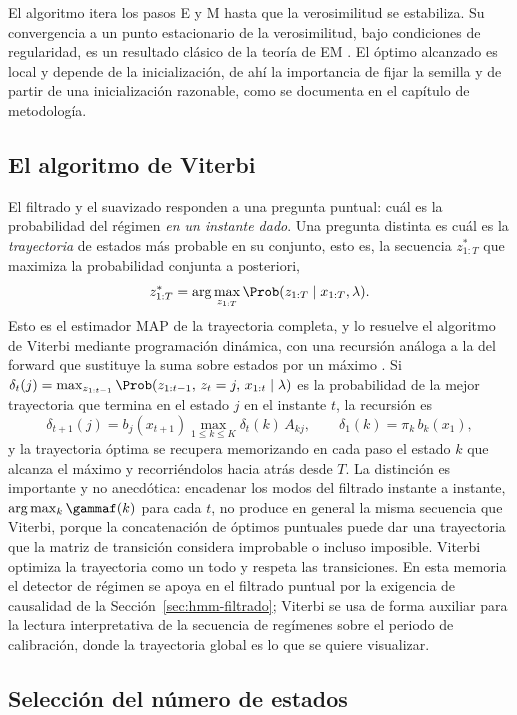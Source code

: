 El algoritmo itera los pasos E y M hasta que la verosimilitud se estabiliza. Su convergencia a un punto estacionario de la verosimilitud, bajo condiciones de regularidad, es un resultado clásico de la teoría de EM \cite{dempster1977}. El óptimo alcanzado es local y depende de la inicialización, de ahí la importancia de fijar la semilla y de partir de una inicialización razonable, como se documenta en el capítulo de metodología.

\subsection{El algoritmo de Viterbi}
\label{sec:hmm-viterbi}

El filtrado y el suavizado responden a una pregunta puntual: cuál es la probabilidad del régimen \emph{en un instante dado}. Una pregunta distinta es cuál es la \emph{trayectoria} de estados más probable en su conjunto, esto es, la secuencia $z_{1:T}^{\ast}$ que maximiza la probabilidad conjunta a posteriori,
\[
z_{1:T}^{\ast} = \arg\max_{z_{1:T}} \Prob(z_{1:T} \mid x_{1:T}, \lambda).
\]
Esto es el estimador MAP de la trayectoria completa, y lo resuelve el algoritmo de Viterbi mediante programación dinámica, con una recursión análoga a la del forward que sustituye la suma sobre estados por un máximo \cite{viterbi1967}. Si $\delta_t(j) = \max_{z_{1:t-1}} \Prob(z_{1:t-1},\, z_t = j,\, x_{1:t} \mid \lambda)$ es la probabilidad de la mejor trayectoria que termina en el estado $j$ en el instante $t$, la recursión es
\[
\delta_{t+1}(j) = b_j(x_{t+1}) \max_{1 \le k \le K} \delta_t(k)\, A_{kj},
\qquad \delta_1(k) = \pi_k\, b_k(x_1),
\]
y la trayectoria óptima se recupera memorizando en cada paso el estado $k$ que alcanza el máximo y recorriéndolos hacia atrás desde $T$. La distinción es importante y no anecdótica: encadenar los modos del filtrado instante a instante, $\arg\max_k \gammaf(k)$ para cada $t$, no produce en general la misma secuencia que Viterbi, porque la concatenación de óptimos puntuales puede dar una trayectoria que la matriz de transición considera improbable o incluso imposible. Viterbi optimiza la trayectoria como un todo y respeta las transiciones. En esta memoria el detector de régimen se apoya en el filtrado puntual por la exigencia de causalidad de la Sección~\ref{sec:hmm-filtrado}; Viterbi se usa de forma auxiliar para la lectura interpretativa de la secuencia de regímenes sobre el periodo de calibración, donde la trayectoria global es lo que se quiere visualizar.

\subsection{Selección del número de estados}
\label{sec:hmm-K}

